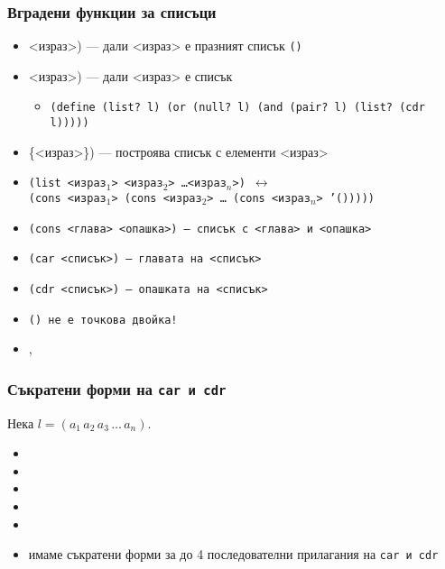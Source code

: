 \documentclass{beamer}
\begin{document}
\begin{frame}
  \frametitle{Вградени функции за списъци}

  \begin{itemize}[<+->]
  \item {}<израз>\tta) --- дали <израз> е празният списък \tt{()}
  \item {}<израз>\tta) --- дали <израз> е списък
    \begin{itemize}
    \item \scriptsize \tt{(define (list? l) (or (null? l) (and (pair? l) (list? (cdr l)))))}
    \end{itemize}
  \item {}\{<израз>\}\tta) --- построява списък с елементи <израз>
  \item \tt{(list }<израз$_1$> <израз$_2$> \ldots <израз$_n$>\tt) $\longleftrightarrow$\\
    \tt{(cons }<израз$_1$>\tt{ (cons }<израз$_2$> \ldots\tt{ (cons }<израз$_n$>\tt{ '()))))}
  \item \tt{(cons }<глава> <опашка>\tt) --- списък с <глава> и <опашка>
  \item \tt{(car }<списък>\tt) --- главата на <списък>
  \item \tt{(cdr }<списък>\tt) --- опашката на <списък>
  \item \alert{\tt{()} не е точкова двойка!}
  \item {}, 
  \end{itemize}
\end{frame}

\begin{frame}
  \frametitle{Съкратени форми на \tt{car} и \tt{cdr}}

  Нека $l = (a_1\,a_2\,a_3\,\ldots\,a_n)$.

  \begin{itemize}[<+->]
  \item {}
  \item {}
  \item {}
  \item {}
  \item {}
  \item имаме съкратени форми за до 4 последователни прилагания на \tt{car} и \tt{cdr}
  \end{itemize}
\end{frame}
\end{document}

